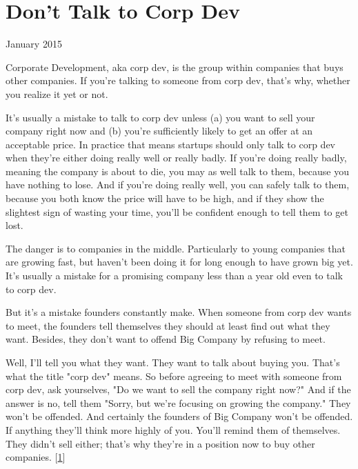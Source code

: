 \chapter{Don't Talk to Corp Dev}


            
              
                

January 2015

Corporate Development, aka corp dev,
                  is the group within companies that buys other companies. If
                  you're talking to someone from corp dev, that's why, whether
                  you realize it yet or not.

It's usually a mistake
                  to talk to corp dev unless (a) you want to sell your company
                  right now and (b) you're sufficiently likely to get an offer
                  at an acceptable price. In practice that means startups should
                  only talk to corp dev when they're either doing really well or
                  really badly. If you're doing really badly, meaning the
                  company is about to die, you may as well talk to them, because
                  you have nothing to lose. And if you're doing really well, you
                  can safely talk to them, because you both know the price will
                  have to be high, and if they show the slightest sign of
                  wasting your time, you'll be confident enough to tell them to
                  get lost.

The danger is to companies in the middle.
                  Particularly to young companies that are growing fast, but
                  haven't been doing it for long enough to have grown big yet.
                  It's usually a mistake for a promising company less than a
                  year old even to talk to corp dev.

But it's a
                  mistake founders constantly make. When someone from corp dev
                  wants to meet, the founders tell themselves they should at
                  least find out what they want. Besides, they don't want to
                  offend Big Company by refusing to meet.

Well, I'll
                  tell you what they want. They want to talk about buying you.
                  That's what the title "corp dev" means. So before agreeing to
                  meet with someone from corp dev, ask yourselves, "Do we want
                  to sell the company right now?" And if the answer is no, tell
                  them "Sorry, but we're focusing on growing the company." They
                  won't be offended. And certainly the founders of Big Company
                  won't be offended. If anything they'll think more highly of
                  you. You'll remind them of themselves. They didn't sell
                  either; that's why they're in a position now to buy other
                  companies.
                  [\href{\#f1n}{1}]

